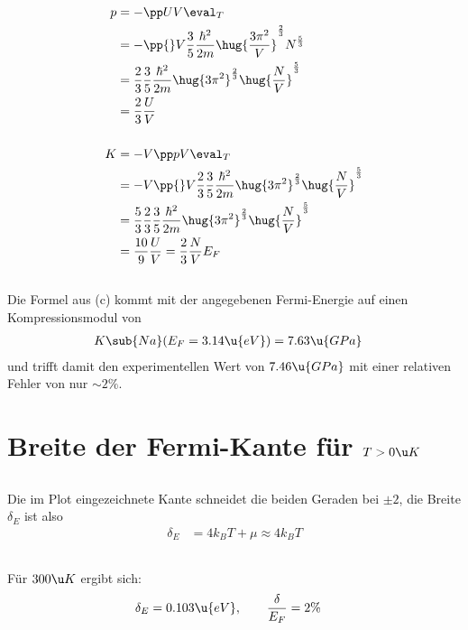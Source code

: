\documentclass[exa]{exercise_5.0}
\begin{document}
\subsection{}
\begin{align*}
    p &= -\pp UV \eval_{T}\\
    &= -\pp {}V  \frac 35  \frac{\hbar^2}{2m}\hug{\frac{3\pi^2}{V}}^\frac23 N^\frac53\\
    &= \frac23 \frac 35  \frac{\hbar^2}{2m}\hug{3\pi^2}^\frac23 \hug{\frac NV}^\frac53\\
    &= \frac23 \frac UV \\
    \\
    K  &= - V \pp p V\eval_T\\
    &= - V \pp{}V \frac23 \frac 35  \frac{\hbar^2}{2m}\hug{3\pi^2}^\frac23 \hug{\frac NV}^\frac53\\
    &= \frac53 \frac23 \frac 35  \frac{\hbar^2}{2m}\hug{3\pi^2}^\frac23 \hug{\frac NV}^\frac53\\
    &= \frac{10}{9}\frac UV = \frac23 \frac NV E_F
\end{align*}

\subsection{}
Die Formel aus (c) kommt mit der angegebenen Fermi-Energie auf einen Kompressionsmodul von
\begin{align*}
    K\sub{Na}(E_F=3.14\u{eV}) &= 7.63\u{GPa}
\end{align*}
und trifft damit den experimentellen Wert von $7.46\u{GPa}$ mit einer relativen Fehler von nur $\sim2\%$.

\section{Breite der Fermi-Kante für $T>0\u K$}

\subsection{}
Die im Plot eingezeichnete Kante schneidet die beiden Geraden bei $\pm2$, die Breite $\delta_E$ ist also 
\begin{align*}
    \delta_{E} &= 4 k_B T +\mu \approx 4k_B T
\end{align*}
\subsection{}
Für $300\u K$ ergibt sich:
\begin{align*}
    \delta_E &= 0.103\u{eV},\qquad \frac\delta{E_F} = 2\%   
\end{align*}
\end{document}
